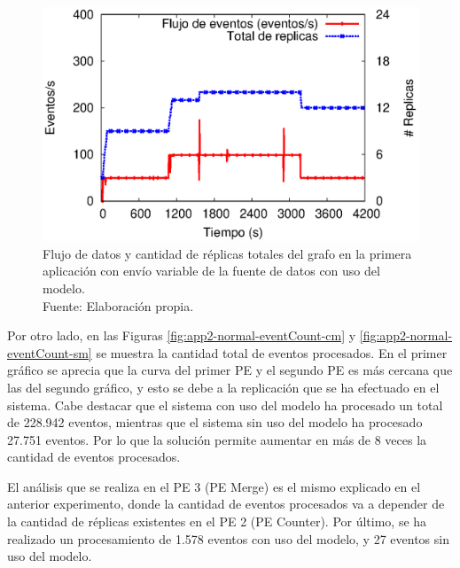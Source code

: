 \begin{figure}[!ht]
	\centering
	\captionsetup{justification=centering}
	\includegraphics[scale=0.7]{images/exp/app2/normal/cm/processSystem.eps}
    \caption[Flujo de datos y cantidad de r\'eplicas totales del grafo en la primera aplicaci\'on con env\'io variable de la fuente de datos con uso del modelo.]{Flujo de datos y cantidad de r\'eplicas totales del grafo en la primera aplicaci\'on con env\'io variable de la fuente de datos con uso del modelo.\\Fuente: Elaboraci\'on propia.}
	\label{fig:app2-normal-processSystem-cm}
\end{figure}


Por otro lado, en las Figuras \ref{fig:app2-normal-eventCount-cm} y \ref{fig:app2-normal-eventCount-sm} se muestra la cantidad total de eventos procesados. En el primer gr\'afico se aprecia que la curva del primer PE y el segundo PE es m\'as cercana que las del segundo gr\'afico, y esto se debe a la replicaci\'on que se ha efectuado en el sistema. Cabe destacar que el sistema con uso del modelo ha procesado un total de 228.942 eventos, mientras que el sistema sin uso del modelo ha procesado 27.751 eventos. Por lo que la soluci\'on permite aumentar en m\'as de 8 veces la cantidad de eventos procesados.

El an\'alisis que se realiza en el PE 3 (PE Merge) es el mismo explicado en el anterior experimento, donde la cantidad de eventos procesados va a depender de la cantidad de r\'eplicas existentes en el PE 2 (PE Counter). Por \'ultimo, se ha realizado un procesamiento de 1.578 eventos con uso del modelo, y 27 eventos sin uso del modelo.

